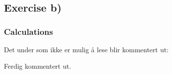 \documentclass{article}
\begin{document}
\subsection{Exercise b)} \label{sec:Method b)}

  \subsubsection{Calculations}

    Det under som ikke er mulig å lese blir kommentert ut:

    \iffalse

    dovkdfv
    fvokdfv
    odkv
    dfvkd
    ofvkdfovkdf

    \fi

    Ferdig kommentert ut. 


\end{document}
